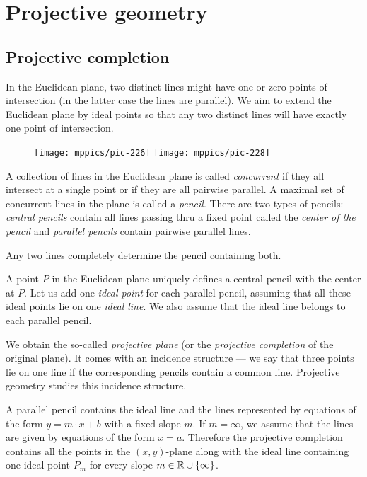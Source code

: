 \chapter{Projective geometry}\label{chap:proj}

\section{Projective completion}

In the Euclidean plane, two distinct lines might have one or zero points of intersection 
(in the latter case the lines are parallel).
We aim to extend the Euclidean plane by ideal points so that any two distinct lines will have exactly one point of intersection.

\begin{wrapfigure}{o}{31mm}
\centering
\texttt{[image: mppics/pic-226]}
\vskip4mm
\texttt{[image: mppics/pic-228]}
\end{wrapfigure}

A collection of lines in the Euclidean plane is called \emph{concurrent} if they all intersect at a single point 
or if they are all pairwise parallel.
A maximal set of concurrent lines in the plane is called a \emph{pencil}.
There are two types of pencils: 
\emph{central pencils} contain all lines passing thru a fixed point called the \emph{center of the pencil}
and  
\emph{parallel pencils} contain pairwise parallel lines.

Any two lines completely determine the pencil containing both.

A point $P$ in the Euclidean plane uniquely defines a central pencil with the center at $P$.
Let us add one \emph{ideal point} for each parallel pencil,
assuming that all these ideal points lie on one \emph{ideal line}.
We also assume that the ideal line belongs to each parallel pencil.

We obtain the so-called \emph{projective plane} (or  the \emph{projective completion} of the original plane). 
It comes with an incidence structure --- we say that three points lie on one line if the corresponding pencils contain a common line.
Projective geometry studies this incidence structure.

A parallel pencil contains the ideal line and the lines represented by equations of the form $y=m\cdot x+b$ with a fixed slope $m$.
If $m=\infty$, we assume that the lines are given by equations of the form $x=a$.
Therefore the projective completion contains all the points in the $(x,y)$-plane along with the ideal line containing one ideal point $P_m$ for every slope $m\in\mathbb{R}\cup\{\infty\}$.

